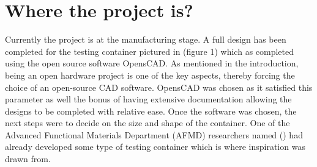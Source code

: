 \documentclass[a4paper,11pt]{article}
\begin{document}
\section{Where the project is?}
Currently the project is at the manufacturing stage. A full design has been completed for the testing container pictured in (figure 1) which as completed using the open source software OpensCAD. As mentioned in the introduction, being an open hardware project is one of the key aspects, thereby forcing the choice of an open-source CAD software. OpensCAD was chosen as it satisfied this parameter as well the bonus of having extensive documentation allowing the designs to be completed with relative ease. Once the software was chosen, the next steps were to decide on the size and shape of the container. One of the Advanced Functional Materials Department (AFMD) researchers named () had already developed some type of testing container which is where inspiration was drawn from. 
\end{document}
